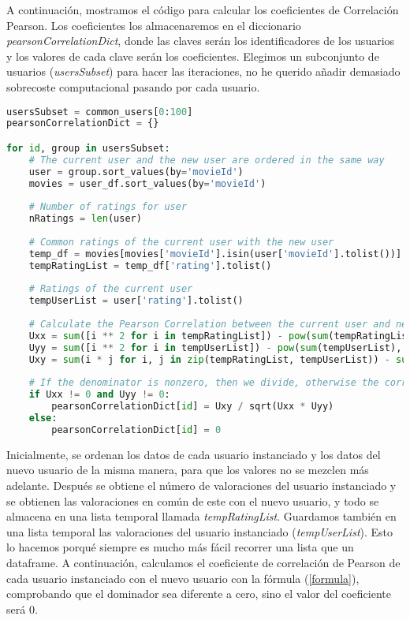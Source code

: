 \documentclass{uimppracticas}
\begin{document}
A continuación, mostramos el código para calcular los coeficientes de Correlación Pearson. Los coeficientes los almacenaremos en el diccionario \textit{pearsonCorrelationDict}, donde las claves serán los identificadores de los usuarios y los valores de cada clave serán los coeficientes. Elegimos un subconjunto de usuarios (\textit{usersSubset}) para hacer las iteraciones, no he querido añadir demasiado sobrecoste computacional pasando por cada usuario.

\begin{lstlisting}[language=python, basicstyle=\small]
usersSubset = common_users[0:100]	
pearsonCorrelationDict = {}

for id, group in usersSubset:
	# The current user and the new user are ordered in the same way
	user = group.sort_values(by='movieId')
	movies = user_df.sort_values(by='movieId')
	
	# Number of ratings for user
	nRatings = len(user)
	
	# Common ratings of the current user with the new user
	temp_df = movies[movies['movieId'].isin(user['movieId'].tolist())]
	tempRatingList = temp_df['rating'].tolist()
	
	# Ratings of the current user
	tempUserList = user['rating'].tolist()
	
	# Calculate the Pearson Correlation between the current user and new user
	Uxx = sum([i ** 2 for i in tempRatingList]) - pow(sum(tempRatingList), 2) / float(nRatings)
	Uyy = sum([i ** 2 for i in tempUserList]) - pow(sum(tempUserList), 2) / float(nRatings)
	Uxy = sum(i * j for i, j in zip(tempRatingList, tempUserList)) - sum(tempRatingList) * sum(tempUserList) / float(nRatings)
	
	# If the denominator is nonzero, then we divide, otherwise the correlation is 0
	if Uxx != 0 and Uyy != 0:
		pearsonCorrelationDict[id] = Uxy / sqrt(Uxx * Uyy)
	else:
		pearsonCorrelationDict[id] = 0
\end{lstlisting}

Inicialmente, se ordenan los datos de cada usuario instanciado y los datos del nuevo usuario de la misma manera, para que los valores no se mezclen más adelante. Después se obtiene el número de valoraciones del usuario instanciado y se obtienen las valoraciones en común de este con el nuevo usuario, y todo se almacena en una lista temporal llamada \textit{tempRatingList}. Guardamos también en una lista temporal las valoraciones del usuario instanciado (\textit{tempUserList}). Esto lo hacemos porqué siempre es mucho más fácil recorrer una lista que un dataframe. A continuación, calculamos el coeficiente de correlación de Pearson de cada usuario instanciado con el nuevo usuario con la fórmula (\ref{formula}), comprobando que el dominador sea diferente a cero, sino el valor del coeficiente será 0.
\end{document}
